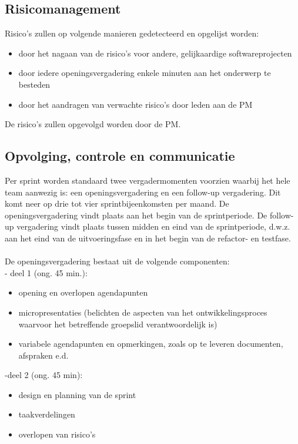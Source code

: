 \documentclass{article}
\begin{document}
\subsection{Risicomanagement}
\label{subsec:risico}
Risico's zullen op volgende manieren gedetecteerd en opgelijst worden:

\begin{itemize}
\item door het nagaan van de risico's voor andere, gelijkaardige softwareprojecten
\item door iedere openingsvergadering enkele minuten aan het onderwerp te besteden 
\item door het aandragen van verwachte risico's door leden aan de PM 
\end{itemize}

De risico's zullen opgevolgd worden door de PM. \newline




\subsection{Opvolging, controle en communicatie}

Per sprint worden standaard twee vergadermomenten voorzien waarbij het hele team aanwezig is: een openingsvergadering en een follow-up vergadering. Dit komt neer op drie tot vier sprintbijeenkomsten per maand. De openingsvergadering vindt plaats aan het begin van de sprintperiode. De follow-up vergadering vindt plaats tussen midden en eind van de sprintperiode, d.w.z. aan het eind van de uitvoeringsfase en in het begin van de refactor- en testfase.\\
\\
\noindent De openingsvergadering bestaat uit de volgende componenten: \\
- deel 1 (ong. 45 min.):
\begin{itemize}
\item opening en overlopen agendapunten
\item micropresentaties (belichten de aspecten van het ontwikkelingsproces waarvoor het betreffende groepslid verantwoordelijk is)
\item variabele agendapunten en opmerkingen, zoals op te leveren documenten, afspraken e.d.
\end{itemize}
\noindent  -deel 2 (ong. 45 min):
\begin{itemize}
\item design en planning van de sprint
\item taakverdelingen
\item overlopen van risico's
\end{itemize}
\end{document}
